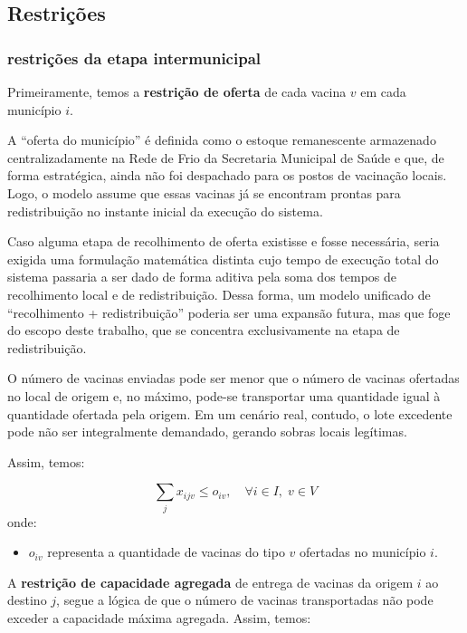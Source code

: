 \subsection{Restrições}

\subsubsection{restrições da etapa intermunicipal}

Primeiramente, temos a \textbf{restrição de oferta} de cada vacina $v$ em cada município $i$.

A ``oferta do município'' é definida como o estoque remanescente armazenado centralizadamente na Rede de Frio da Secretaria Municipal de Saúde e que, de forma estratégica, ainda não foi despachado para os postos de vacinação locais.  Logo, o modelo assume que essas vacinas já se encontram prontas para redistribuição no instante inicial da execução do sistema.

Caso alguma etapa de recolhimento de oferta existisse e fosse necessária, seria exigida uma formulação matemática distinta cujo tempo de execução total do sistema passaria a ser dado de forma aditiva pela soma dos tempos de recolhimento local e de redistribuição. Dessa forma, um modelo unificado de ``recolhimento + redistribuição'' poderia ser uma expansão futura, mas que foge do escopo deste trabalho, que se concentra exclusivamente na etapa de redistribuição.

O número de vacinas enviadas pode ser menor que o número de vacinas ofertadas no local de origem e, no máximo, pode-se transportar uma quantidade igual à quantidade ofertada pela origem. Em um cenário real, contudo, o lote excedente pode não ser integralmente demandado, gerando sobras locais legítimas.

Assim, temos:

\begin{equation*}
    \sum_{j} x_{ijv} \le o_{iv}, \quad \forall i \in I, \; v \in V
\end{equation*}
onde:
\begin{itemize}
    \item $o_{iv}$ representa a quantidade de vacinas do tipo $v$ ofertadas no município $i$.
\end{itemize}

A \textbf{restrição de capacidade agregada} de entrega de vacinas da origem $i$ ao destino $j$, segue a lógica de que o número de vacinas transportadas não pode exceder a capacidade máxima agregada. Assim, temos:


